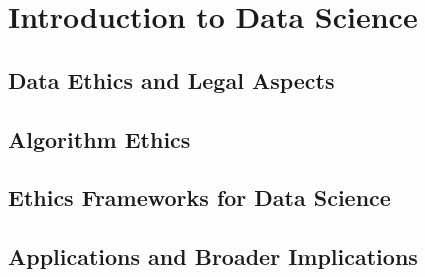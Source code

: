 \section{Introduction to Data Science}


\subsection{Data Ethics and Legal Aspects
}

\subsection{Algorithm Ethics
}

\subsection{Ethics Frameworks for Data Science
}

\subsection{Applications and Broader Implications
}